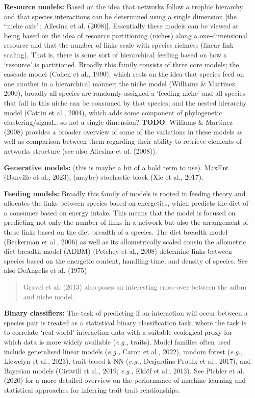 \documentclass[
]{article}
\begin{document}
\textbf{Resource models:} Based on the idea that networks follow a
trophic hierarchy and that species interactions can be determined using
a single dimension {[}the ``niche axis''; Allesina et al. (2008){]}.
Essentially these models can be viewed as being based on the idea of
resource partitioning (niches) along a one-dimensional resource and that
the number of links scale with species richness (linear link scaling).
That is, there is some sort of hierarchical feeding based on how a
`resource' is partitioned. Broadly this family consists of three core
models; the cascade model (Cohen et al., 1990), which rests on the idea
that species feed on one another in a hierarchical manner; the niche
model (Williams \& Martinez, 2000), broadly all species are randomly
assigned a `feeding niche' and all species that fall in this niche can
be consumed by that species; and the nested hierarchy model (Cattin et
al., 2004), which adds some component of phylogenetic
clustering/signal\ldots{} so not a single dimension? \textbf{TODO}.
Williams \& Martinez (2008) provides a broader overview of some of the
variations in these models as well as comparison between them regarding
their ability to retrieve elements of networks structure (see also
Allesina et al. (2008)).

\textbf{Generative models:} (this is maybe a bit of a bold term to use).
MaxEnt (Banville et al., 2023), (maybe) stochastic block (Xie et al.,
2017).

\textbf{Feeding models:} Broadly this family of models is rooted in
feeding theory and allocates the links between species based on
energetics, which predicts the diet of a consumer based on energy
intake. This means that the model is focused on predicting not only the
number of links in a network but also the arrangement of these links
based on the diet breadth of a species. The diet breadth model
(Beckerman et al., 2006) as well as its allometrically scaled cousin the
allometric diet breadth model (ADBM) (Petchey et al., 2008) determine
links between species based on the energetic content, handling time, and
density of species. See also DeAngelis et al. (1975)

\begin{quote}
Gravel et al. (2013) also poses an interesting cross-over between the
adbm and niche model.
\end{quote}

\textbf{Binary classifiers:} The task of predicting if an interaction
will occur between a species pair is treated as a statistical binary
classification task, where the task is to correlate `real world'
interaction data with a suitable ecological proxy for which data is more
widely available (\emph{e.g.,} traits). Model families often used
include generalised linear models (\emph{e.g.,} Caron et al., 2022),
random forest (\emph{e.g.,} Llewelyn et al., 2023), trait-based k-NN
(\emph{e.g.,} Desjardins-Proulx et al., 2017), and Bayesian models
(Cirtwill et al., 2019; \emph{e.g.,} Eklöf et al., 2013). See Pichler et
al. (2020) for a more detailed overview on the performance of machine
learning and statistical approaches for inferring trait-trait
relationships.
\end{document}

